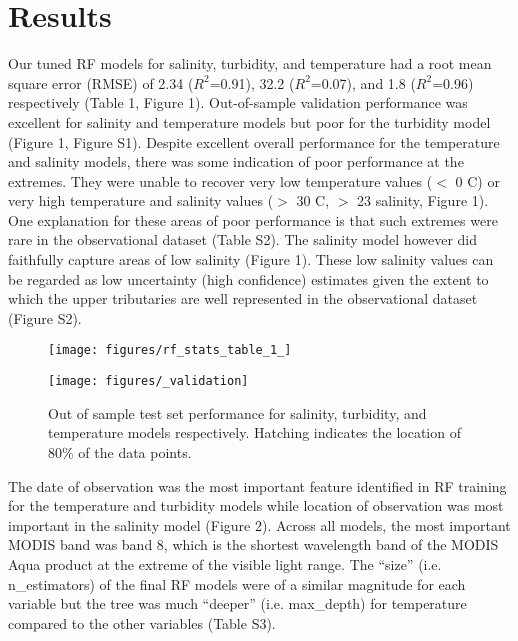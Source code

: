 \documentclass{article}
\begin{document}
\section{Results}

Our tuned RF models for salinity, turbidity, and temperature had a root mean square error (RMSE) of 2.34 ($R^2$=0.91), 32.2 ($R^2$=0.07), and 1.8 ($R^2$=0.96) respectively (Table 1, Figure 1). Out-of-sample validation performance was excellent for salinity and temperature models but poor for the turbidity model (Figure 1, Figure S1). Despite excellent overall performance for the temperature and salinity models, there was some indication of poor performance at the extremes. They were unable to recover very low temperature values ($<$ 0 C) or very high temperature and salinity values ($>$ 30 C, $>$ 23 salinity, Figure 1). One explanation for these areas of poor performance is that such extremes were rare in the observational dataset (Table S2). The salinity model however did faithfully capture areas of low salinity (Figure 1). These low salinity values can be regarded as low uncertainty (high confidence) estimates given the extent to which the upper tributaries are well represented in the observational dataset (Figure S2).

\begin{figure}[ht!]
    \begin{center}
          \texttt{[image: figures/rf\_stats\_table\_1\_]}          
    \end{center}    
\end{figure}

\begin{figure}[ht!]
    \begin{center}
          \texttt{[image: figures/\_validation]}
          \caption{Out of sample test set performance for salinity, turbidity, and temperature models respectively. Hatching indicates the location of 80\% of the data points.}
    \end{center}    
\end{figure}

The date of observation was the most important feature identified in RF training for the temperature and turbidity models while location of observation was most important in the salinity model (Figure 2). Across all models, the most important MODIS band was band 8, which is the shortest wavelength band of the MODIS Aqua product at the extreme of the visible light range. The “size” (i.e. n\_estimators) of the final RF models were of a similar magnitude for each variable but the tree was much “deeper” (i.e. max\_depth) for temperature compared to the other variables (Table S3).
\end{document}
